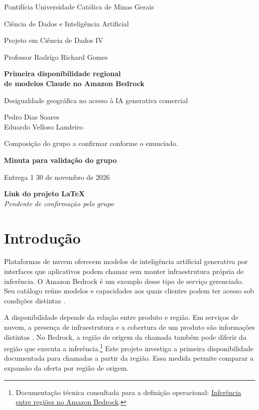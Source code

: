 \documentclass[12pt,a4paper]{article}
\newcommand{\linkprojeto}{\emph{Pendente de confirmação pelo grupo}}
\begin{document}
\begin{titlepage}
\centering
{\large Pontifícia Universidade Católica de Minas Gerais\par}
Ciência de Dados e Inteligência Artificial\par
Projeto em Ciência de Dados IV\par
Professor Rodrigo Richard Gomes\par
\vspace{3.8cm}
{\LARGE\bfseries Primeira disponibilidade regional\\[0.2em]
de modelos Claude no Amazon Bedrock\par}
\vspace{1.1cm}
{\large Desigualdade geográfica no acesso à IA generativa comercial\par}
\vspace{1.4cm}
{\large Pedro Dias Soares\\Eduardo Velloso Landeiro\par}
Composição do grupo a confirmar conforme o enunciado.\par
\vfill
\textbf{Minuta para validação do grupo}\par
Entrega 1 \textbar{} 30 de novembro de 2026\par
\vspace{0.75cm}
\textbf{Link do projeto LaTeX}\\\linkprojeto
\end{titlepage}
\hypersetup{pageanchor=true}

\section{Introdução}

Plataformas de nuvem oferecem modelos de inteligência artificial generativa por interfaces que aplicativos podem chamar sem manter infraestrutura própria de inferência. O Amazon Bedrock é um exemplo desse tipo de serviço gerenciado. Seu catálogo reúne modelos e capacidades aos quais clientes podem ter acesso sob condições distintas \citep[seções 3.2.1 e 4.6]{patel2024}.

A disponibilidade depende da relação entre produto e região. Em serviços de nuvem, a presença de infraestrutura e a cobertura de um produto são informações distintas \citep[seção III-E]{ekwe2024}. No Bedrock, a região de origem da chamada também pode diferir da região que executa a inferência.\footnote{Documentação técnica consultada para a definição operacional: \href{https://docs.aws.amazon.com/bedrock/latest/userguide/cross-region-inference.html}{Inferência entre regiões no Amazon Bedrock}.} Este projeto investiga a primeira disponibilidade documentada para chamadas a partir da região. Essa medida permite comparar a expansão da oferta por região de origem.
\end{document}
